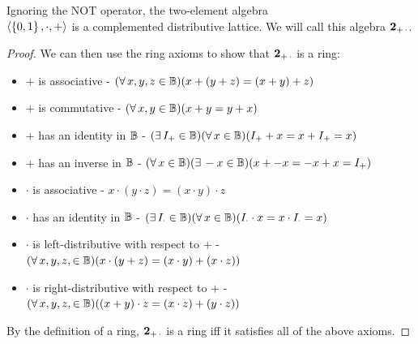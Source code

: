             \begin{theorem}
                Ignoring the NOT operator, the two-element algebra \\ $\langle\left\{0,1\right\},\cdot,+\rangle$ is a complemented distributive lattice.
                We will call this algebra $\operatorname{\mathbf{2}_{+\,\cdot}}$.
            \end{theorem}
            \begin{proof}
                We can then use the ring axioms to show that $\operatorname{\mathbf{2}_{+\,\cdot}}$ is a ring:
                \begin{itemize}
                    \item $+$ is associative - $(\forall\,x,y,z\in\operatorname{\mathbb{B}})(x+(y+z)=(x+y)+z)$
                    \item $+$ is commutative - $(\forall\,x,y\in\operatorname{\mathbb{B}})(x+y=y+x)$
                    \item $+$ has an identity in $\operatorname{\mathbb{B}}$ - $(\exists\,I_+\in\operatorname{\mathbb{B}})(\forall\,x\in\operatorname{\mathbb{B}})(I_++x=x+I_+=x)$
                    \item $+$ has an inverse in $\operatorname{\mathbb{B}}$ - $(\forall\,x\in\operatorname{\mathbb{B}})(\exists\,-x\in\operatorname{\mathbb{B}})(x+-x=-x+x=I_+)$
                    \item $\cdot$ is associative - $x\cdot(y\cdot z)=(x\cdot y)\cdot z$
                    \item $\cdot$ has an identity in $\operatorname{\mathbb{B}}$ - $(\exists\,I_\cdot\in\operatorname{\mathbb{B}})(\forall\,x\in\operatorname{\mathbb{B}})(I_\cdot\cdot x=x\cdot I_\cdot=x)$
                    \item $\cdot$ is left-distributive with respect to $+$ - $(\forall\,x,y,z,\in\operatorname{\mathbb{B}}) \\ (x\cdot(y+z)=(x\cdot y)+(x\cdot z))$
                    \item $\cdot$ is right-distributive with respect to $+$ - $(\forall\,x,y,z,\in\operatorname{\mathbb{B}}) \\ ((x+y)\cdot z=(x\cdot z)+(y\cdot z))$
                \end{itemize}
                By the definition of a ring, $\operatorname{\mathbf{2}_{+\,\cdot}}$ is a ring iff it satisfies all of the above axioms.

            \end{proof}

    \newpage